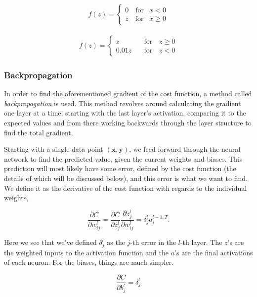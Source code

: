 \documentclass[../main.tex]{subfiles}
\begin{document}
\begin{align}
    f(z) = 
    \begin{cases}
    0 \quad \text{for} &x<0 \\
    z \quad \text{for} &x\geq0
    \end{cases}
    \label{eq:ReLU}
\end{align}

\begin{align}
    f(z) = 
    \begin{cases}
    z \quad &\text{for} \quad z\geq0\\
    0.01z \quad &\text{for} \quad z<0
    \end{cases}
    \label{eq:leaky-ReLU}
\end{align}

\subsubsection{Backpropagation}
In order to find the aforementioned gradient of the cost function, a method called \textit{backpropagation} is used. This method revolves around calculating the gradient one layer at a time, starting with the last layer's activation, comparing it to the expected values and from there working backwards through the layer structure to find the total gradient.

Starting with a single data point $(\mathbf x,\mathbf y)$, we feed forward through the neural network to find the predicted value, given the current weights and biases. This prediction will most likely have some error, defined by the cost function (the details of which will be discussed below), and this error is what we want to find. We define it as the derivative of the cost function with regards to the individual weights,

\begin{equation*}
    \frac{\partial C}{\partial w_{ij}^l} = \frac{\partial C}{\partial z_j^l}\frac{\partial z_j^l}{\partial w_{ij}^l} = \delta_j^l a_i^{l-1, T}.
\end{equation*}

Here we see that we've defined $\delta_j^l$ as the $j$-th error in the $l$-th layer. The $z$'s are the weighted inputs to the activation function and the $a$'s are the final activations of each neuron. For the biases, things are much simpler.

\begin{equation*}
    \frac{\partial C}{\partial b^l_j} = \delta_j^l
\end{equation*}
\end{document}
